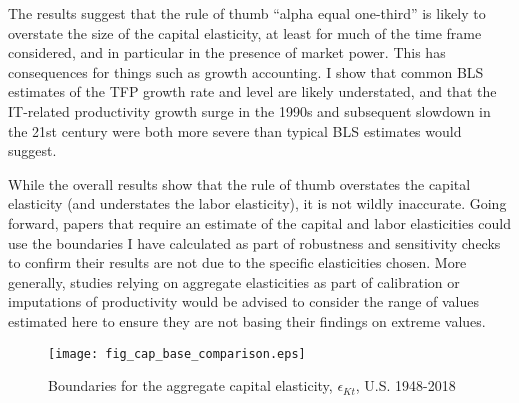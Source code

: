 \documentclass[11pt]{article}
\begin{document}
The results suggest that the rule of thumb ``alpha equal one-third'' is likely to overstate the size of the capital elasticity, at least for much of the time frame considered, and in particular in the presence of market power. This has consequences for things such as growth accounting. I show that common BLS estimates of the TFP growth rate and level are likely understated, and that the IT-related productivity growth surge in the 1990s and subsequent slowdown in the 21st century were both more severe than typical BLS estimates would suggest.

While the overall results show that the rule of thumb overstates the capital elasticity (and understates the labor elasticity), it is not wildly inaccurate. Going forward, papers that require an estimate of the capital and labor elasticities could use the boundaries I have calculated as part of robustness and sensitivity checks to confirm their results are not due to the specific elasticities chosen. More generally, studies relying on aggregate elasticities as part of calibration or imputations of productivity would be advised to consider the range of values estimated here to ensure they are not basing their findings on extreme values.

\clearpage

\onehalfspacing
{\small


}

\clearpage

\begin{figure}[!htb]
\begin{center}
\caption{Boundaries for the aggregate capital elasticity, $\epsilon_{Kt}$, U.S. 1948-2018}
\label{FIG_cap_comparison}
\texttt{[image: fig\_cap\_base\_comparison.eps]}
\end{center}
\vspace{-.5cm}
\end{figure}
\end{document}

